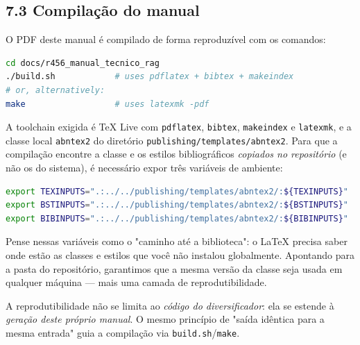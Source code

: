 \subsection*{7.3 Compilação do manual}

 O PDF deste manual é compilado de forma reproduzível com os comandos:

\begin{lstlisting}[language=bash, caption={Comando de compilação reproduzível do manual.}]
cd docs/r456_manual_tecnico_rag
./build.sh            # uses pdflatex + bibtex + makeindex
# or, alternatively:
make                  # uses latexmk -pdf
\end{lstlisting}

 A toolchain exigida é TeX Live com \texttt{pdflatex}, \texttt{bibtex},
\texttt{makeindex} e \texttt{latexmk}, e a classe local \texttt{abntex2} do
diretório \texttt{publishing/templates/abntex2}. Para que a compilação encontre a
classe e os estilos bibliográficos \emph{copiados no repositório} (e não os do
sistema), é necessário expor três variáveis de ambiente:

\begin{lstlisting}[language=bash, caption={Variáveis de ambiente para localizar a classe abntex2 local.}]
export TEXINPUTS=".:../../publishing/templates/abntex2/:${TEXINPUTS}"
export BSTINPUTS=".:../../publishing/templates/abntex2/:${BSTINPUTS}"
export BIBINPUTS=".:../../publishing/templates/abntex2/:${BIBINPUTS}"
\end{lstlisting}

\begin{intuicao}
Pense nessas variáveis como o "caminho até a biblioteca": o \LaTeX{} precisa saber
onde estão as classes e estilos que você não instalou globalmente. Apontando para
a pasta do repositório, garantimos que a mesma versão da classe seja usada em
qualquer máquina --- mais uma camada de reprodutibilidade.
\end{intuicao}

\begin{pontochave}
A reprodutibilidade não se limita ao \emph{código do diversificador}: ela se
estende à \emph{geração deste próprio manual}. O mesmo princípio de "saída
idêntica para a mesma entrada" guia a compilação via \texttt{build.sh}/\texttt{make}.
\end{pontochave}
